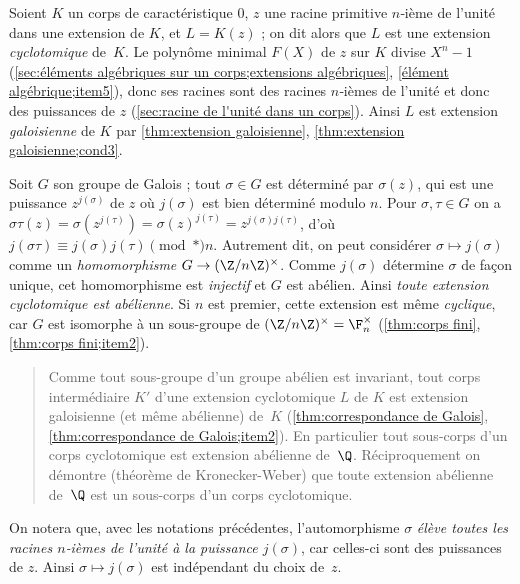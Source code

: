 \documentclass[11pt, %
  title in boldface,
  theorem in new line,
  theorem numbering = section,
  number theorems separately,
  simple name,
]{beaulivre}
\begin{document}
    \begin{example*}\label{ex:extensions cyclotomiques}
        Soient \( K \) un corps de caractéristique \( 0 \), \( z \) une racine primitive \( n \)‑ième de l'unité dans une extension de \( K \), et \( L = K(z) \) ; on dit alors que \( L \) est une extension \emph{cyclotomique} de~\( K \). Le polynôme minimal \( F(X) \) de \( z \) sur \( K \) divise \( X^n - 1 \) (\cref{sec:éléments algébriques sur un corps;extensions algébriques}, \ref{élément algébrique;item5}), donc ses racines sont des racines \( n \)‑ièmes de l'unité et donc des puissances de \( z \) (\cref{sec:racine de l'unité dans un corps}). Ainsi \( L \) est extension \emph{galoisienne} de \( K \) par \cref{thm:extension galoisienne}, \ref{thm:extension galoisienne;cond3}.

        Soit \( G \) son groupe de Galois ; tout \( \sigma \in G \) est déterminé par \( \sigma(z) \), qui est une puissance \( z^{j(\sigma)} \) de \( z \) où \( j(\sigma) \) est bien déterminé modulo \( n \). Pour \( \sigma, \tau \in G \) on a \( \sigma\tau(z) = \sigma(z^{j(\tau)}) = \sigma(z)^{j(\tau)} = z^{j(\sigma)j(\tau)} \), d'où \( j(\sigma\tau) \equiv j(\sigma)j(\tau) \pmod*{n} \). Autrement dit, on peut considérer \( \sigma \mapsto j(\sigma) \) comme un \emph{homomorphisme} \( G \to (\Z/n\Z)^\times \). Comme \( j(\sigma) \) détermine \( \sigma \) de façon unique, cet homomorphisme est \emph{injectif} et \( G \) est abélien. Ainsi \emph{toute extension cyclotomique est abélienne}. Si \( n \) est premier, cette extension est même \emph{cyclique}, car \( G \) est isomorphe à un sous-groupe de \( (\Z/n\Z)^\times = \F_n^\times \) (\cref{thm:corps fini}, \ref{thm:corps fini;item2}).
        \begin{quote}
            Comme tout sous-groupe d'un groupe abélien est invariant, tout corps intermédiaire \( K' \) d'une extension cyclotomique \( L \) de \( K \) est extension galoisienne (et même abélienne) de~\( K \) (\cref{thm:correspondance de Galois}, \ref{thm:correspondance de Galois;item2}). En particulier tout sous-corps d'un corps cyclotomique est extension abélienne de~\( \Q \). Réciproquement on démontre (théorème de Kronecker-Weber) que toute extension abélienne de~\( \Q \) est un sous-corps d'un corps cyclotomique.
        \end{quote}
        On notera que, avec les notations précédentes, l'automorphisme \( \sigma \) \emph{élève toutes les racines \( n \)‑ièmes de l'unité à la puissance \( j(\sigma) \)}, car celles-ci sont des puissances de \( z \). Ainsi \( \sigma \mapsto j(\sigma) \) est indépendant du choix de~\( z \).
    \end{example*}
\end{document}
